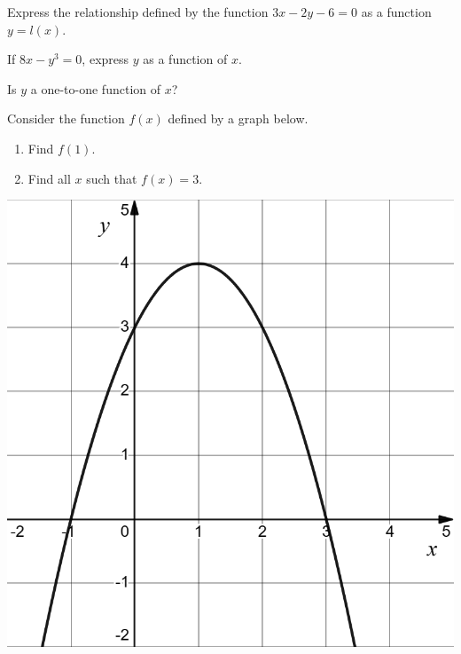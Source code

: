\newpage

\begin{exercise}
  Express the relationship defined by the function $3x-2y-6=0$ as a function $y=l(x)$.
\end{exercise}

\begin{exercise}
  If \(8x-y^3=0\), express \(y\) as a function of \(x\).

  Is $y$ a one-to-one function of $x$?
\end{exercise}


\begin{exercise}
  Consider the function $f(x)$ defined by a graph below.

  \begin{multicols}{2}
    \begin{enumerate}
      \item Find $f(1)$. 
      \item Find all $x$ such that $f(x)=3$.
    \end{enumerate}
    \vfill\mbox{}

    \columnbreak
    
    \begin{center}
      \includegraphics[scale=0.3]{figs/f(x)=-x^2+2x+2.png}
    \end{center}
  \end{multicols}
\end{exercise}
\vspace{-10\baselineskip}


